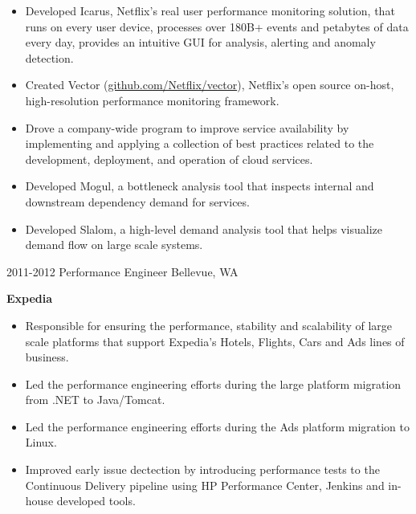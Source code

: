 \begin{entrylist}
{\begin{itemize}
        \item Developed Icarus, Netflix's real user performance monitoring solution, that runs on every user device, processes over 180B+ events and petabytes of data every day, provides an intuitive GUI for analysis, alerting and anomaly detection.
        \item Created Vector (\href{https://github.com/Netflix/vector}{github.com/Netflix/vector}), Netflix's open source on-host, high-resolution performance monitoring framework.
        \item Drove a company-wide program to improve service availability by implementing and applying a collection of best practices related to the development, deployment, and operation of cloud services.
        \item Developed Mogul, a bottleneck analysis tool that inspects internal and downstream dependency demand for services.
        \item Developed Slalom, a high-level demand analysis tool that helps visualize demand flow on large scale systems.
      \end{itemize}
    }
  \entry
    {2011-2012}
    {Performance Engineer}
    {Bellevue, WA}
    {
      \textbf{Expedia}
      \begin{itemize}
        \item Responsible for ensuring the performance, stability and scalability of large scale platforms that support Expedia's Hotels, Flights, Cars and Ads lines of business.
        \item Led the performance engineering efforts during the large platform migration from .NET to Java/Tomcat.
        \item Led the performance engineering efforts during the Ads platform migration to Linux.
        \item Improved early issue dectection by introducing performance tests to the Continuous Delivery pipeline using HP Performance Center, Jenkins and in-house developed tools.

\end{itemize}}
\end{entrylist}
